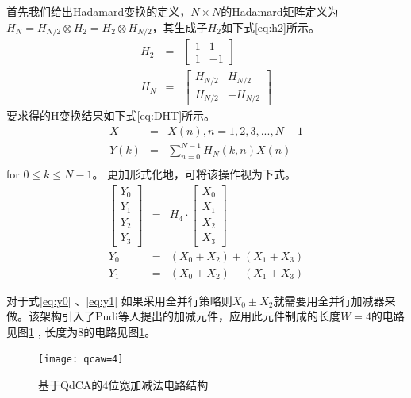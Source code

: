 \documentclass[UTF8, 11pt, a4paper]{ctexart}
\begin{document}
首先我们给出Hadamard变换的定义，$N\times N$的Hadamard矩阵定义为$H_N=H_{N/2}\otimes H_{2}=H_{2} \otimes H_{N/2}$，其生成子$H_2$如下式\ref{eq:h2}所示。
\begin{eqnarray}
\label{eq:h2}
H_2 & = & \left[\begin{array}{cc}1 & 1 \\1 & -1\end{array}\right] \\
\label{eq:hn}
H_N & = & \left[\begin{array}{cc}H_{N/2} & H_{N/2} \\H_{N/2} & -H_{N/2} \end{array}\right] 
\end{eqnarray}
要求得的H变换结果如下式\ref{eq:DHT}所示。
\begin{eqnarray}
X&=&{X(n),n=1,2,3,...,N-1} \\
\label{eq:DHT}
Y(k)&=&\sum_{n=0}^{N-1}H_{N}(k,n)X(n) \\
\end{eqnarray}
for $0 \le k \le N-1$。
更加形式化地，可将该操作视为下式。
\begin{eqnarray}
 \left[\begin{array}{c}Y_0 \\Y_1 \\Y_2 \\Y_3\end{array}\right] & = & H_4 \cdot  \left[\begin{array}{c}X_0 \\X_1 \\X_2 \\X_3\end{array}\right] \\
\label{eq:y0}
Y_0 & = & (X_0 + X_2) + (X_1 + X_3) \\
\label{eq:y1}
Y_1 & = & (X_0 + X_2) - (X_1 + X_3) 
\end{eqnarray}

对于式\ref{eq:y0} 、\ref{eq:y1} 如果采用全并行策略则$X_0 \pm X_2$就需要用全并行加减器来做。该架构引入了Pudi等人提出的加减元件\cite{adder}，应用此元件制成的长度$W=4$的电路见图\ref{gf:qcaw4} , 长度为8的电路见图\ref{gf:qcaw4}。 

\begin{figure}[H]
\begin{center}
\texttt{[image: qcaw=4]}
\caption{基于QdCA的4位宽加减法电路结构}
\label{gf:qcaw4}
\end{center}
\end{figure}
\end{document}

